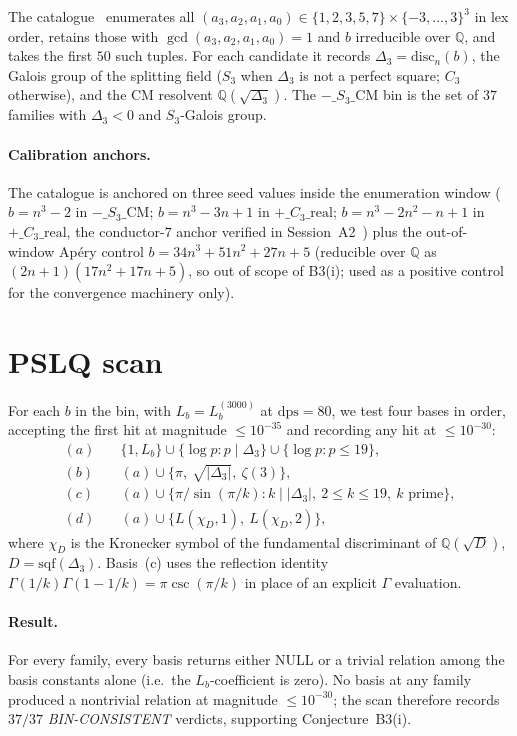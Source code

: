 \documentclass[11pt,reqno]{amsart}
\theoremstyle{definition}
\newcommand{\Q}{\mathbb{Q}}
\newcommand{\dps}{\mathrm{dps}}
\begin{document}
The catalogue~\cite[Session~A]{pcf2v1} enumerates all
$(a_3,a_2,a_1,a_0)\in\{1,2,3,5,7\}\times\{-3,\dotsc,3\}^3$
in lex order, retains those with $\gcd(a_3,a_2,a_1,a_0)=1$ and $b$
irreducible over $\Q$, and takes the first $50$ such tuples. For each
candidate it records
$\Delta_3 = \mathrm{disc}_n(b)$, the Galois group of the splitting field
($S_3$ when $\Delta_3$ is not a perfect square; $C_3$ otherwise), and
the CM resolvent $\Q(\sqrt{\Delta_3})$. The $-\_S_3\_\mathrm{CM}$ bin is
the set of $37$ families with $\Delta_3<0$ and $S_3$-Galois group.

\paragraph{Calibration anchors.} The catalogue is anchored on three
seed values inside the enumeration window
($b = n^3 - 2$ in $-\_S_3\_\mathrm{CM}$;
$b = n^3 - 3n + 1$ in $+\_C_3\_\mathrm{real}$;
$b = n^3 - 2n^2 - n + 1$ in $+\_C_3\_\mathrm{real}$, the conductor-$7$
anchor verified in Session~A2~\cite{sessA2})
plus the out-of-window Ap{\'e}ry control
$b = 34n^3 + 51n^2 + 27n + 5$ (reducible over $\Q$ as
$(2n+1)(17n^2+17n+5)$, so out of scope of B3(i); used as a positive
control for the convergence machinery only).

\section{PSLQ scan}\label{sec:pslq}

For each $b$ in the bin, with $L_b = L_b^{(3000)}$ at $\dps = 80$,
we test four bases in order, accepting the first hit at magnitude
$\le 10^{-35}$ and recording any hit at $\le 10^{-30}$:
\begin{align}
   (a)\quad &\{1, L_b\} \cup \{\log p : p\mid \Delta_3\} \cup \{\log p : p\le 19\}, \\
   (b)\quad &(a) \cup \{\pi,\ \sqrt{|\Delta_3|},\ \zeta(3)\}, \\
   (c)\quad &(a) \cup \bigl\{\pi/\sin(\pi/k) : k\mid |\Delta_3|,\ 2\le k\le 19,\ k\text{ prime}\bigr\}, \\
   (d)\quad &(a) \cup \{L(\chi_D, 1),\ L(\chi_D, 2)\},
\end{align}
where $\chi_D$ is the Kronecker symbol of the fundamental discriminant
of $\Q(\sqrt{D})$, $D=\mathrm{sqf}(\Delta_3)$. Basis~(c) uses the
reflection identity $\Gamma(1/k)\Gamma(1-1/k) = \pi\csc(\pi/k)$ in
place of an explicit $\Gamma$ evaluation.

\paragraph{Result.} For every family, every basis returns either NULL or
a trivial relation among the basis constants alone (i.e.\ the
$L_b$-coefficient is zero). No basis at any family produced a
nontrivial relation at magnitude $\le 10^{-30}$; the scan therefore
records $37/37$ \emph{BIN-CONSISTENT} verdicts, supporting Conjecture~B3(i).
\end{document}
